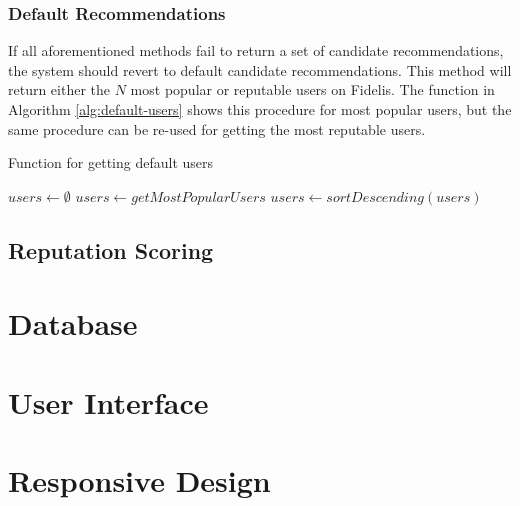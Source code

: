 \subsubsection{Default Recommendations}
If all aforementioned methods fail to return a set of candidate recommendations, the system should revert to default candidate recommendations. This method will return either the $N$ most popular or reputable users on Fidelis. The function in Algorithm \ref{alg:default-users} shows this procedure for most popular users, but the same procedure can be re-used for getting the most reputable users.

\begin{algorithm}
\caption{Function for getting default users}
\label{alg:default-users}
\begin{algorithmic}[1]
	\State $users\gets \emptyset$
	\State $users\gets getMostPopularUsers$
	\State $users\gets sortDescending(users)$
	\State {}
\EndFunction
\end{algorithmic}
\end{algorithm}

\subsection{Reputation Scoring}

\section{Database}

\section{User Interface}

\section{Responsive Design}